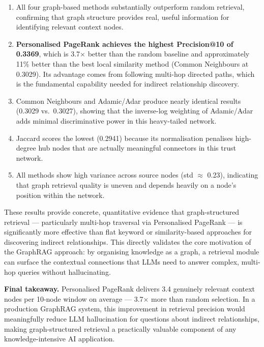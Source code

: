 \documentclass[10pt]{article}
\begin{document}
\begin{enumerate}
  \item All four graph-based methods substantially outperform random retrieval, confirming that graph structure provides real, useful information for identifying relevant context nodes.
  \item \textbf{Personalised PageRank achieves the highest Precision@10 of 0.3369}, which is 3.7$\times$ better than the random baseline and approximately 11\% better than the best local similarity method (Common Neighbours at 0.3029). Its advantage comes from following multi-hop directed paths, which is the fundamental capability needed for indirect relationship discovery.
  \item Common Neighbours and Adamic/Adar produce nearly identical results (0.3029 vs.\ 0.3027), showing that the inverse-log weighting of Adamic/Adar adds minimal discriminative power in this heavy-tailed network.
  \item Jaccard scores the lowest (0.2941) because its normalisation penalises high-degree hub nodes that are actually meaningful connectors in this trust network.
  \item All methods show high variance across source nodes (std $\approx$ 0.23), indicating that graph retrieval quality is uneven and depends heavily on a node's position within the network.
\end{enumerate}

These results provide concrete, quantitative evidence that graph-structured retrieval --- particularly multi-hop traversal via Personalised PageRank --- is significantly more effective than flat keyword or similarity-based approaches for discovering indirect relationships. This directly validates the core motivation of the GraphRAG approach: by organising knowledge as a graph, a retrieval module can surface the contextual connections that LLMs need to answer complex, multi-hop queries without hallucinating.

\begin{callout}
\textbf{Final takeaway.} Personalised PageRank delivers 3.4 genuinely relevant context nodes per 10-node window on average --- 3.7$\times$ more than random selection. In a production GraphRAG system, this improvement in retrieval precision would meaningfully reduce LLM hallucination for questions about indirect relationships, making graph-structured retrieval a practically valuable component of any knowledge-intensive AI application.
\end{callout}
\end{document}
